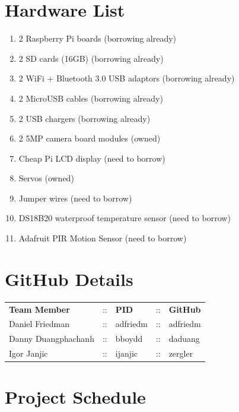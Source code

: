 \section{Hardware List}
\begin{enumerate}
    \item 2 Raspberry Pi boards (borrowing already)
    \item 2 SD cards (16GB) (borrowing already)
    \item 2 WiFi + Bluetooth 3.0 USB adaptors (borrowing already)
    \item 2 MicroUSB cables (borrowing already)
    \item 2 USB chargers (borrowing already)
    \item 2 5MP camera board modules (owned)
    \item Cheap Pi LCD display (need to borrow)
    \item Servos (owned)
    \item Jumper wires (need to borrow)
    \item DS18B20 waterproof temperature sensor (need to borrow)
    \item Adafruit PIR Motion Sensor (need to borrow)

\end{enumerate}

\section{GitHub Details}
\begin{tabular}{ l c l c l}
    \textbf{Team Member} & :: & \textbf{PID} & :: & \textbf{GitHub} \\
    Daniel Friedman      & :: & adfriedm     & :: & adfriedm        \\
    Danny Duangphachanh  & :: & bboydd       & :: & daduang         \\
    Igor Janjic          & :: & ijanjic      & :: & zergler
\end{tabular}

\section{Project Schedule}

